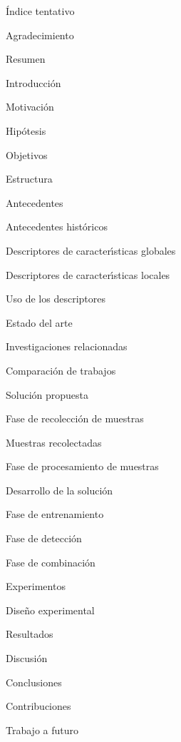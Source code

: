 \documentclass{article}
\def\autor{José Angel Ramírez Cantú}
\def\asesora{Dra.\ Satu Elisa Schaeffer}
\begin{document}
{\huge \'{I}ndice tentativo}

{\large Agradecimiento }

{\large Resumen}

\vspace*{2mm}

{\Large Introducci\'{o}n}

{\large Motivaci\'{o}n}

{\large Hip\'{o}tesis}

{\large Objetivos}

{\large Estructura}

\medskip

{\Large Antecedentes}

{\large Antecedentes hist\'{o}ricos}

{\large Descriptores de caracter\'{\i}sticas globales}

{\large Descriptores de caracter\'{\i}sticas locales}

{\large Uso de los descriptores}

\medskip

{\Large Estado del arte}

{\large Investigaciones relacionadas}

{\large Comparaci\'{o}n de trabajos}

\medskip

{\Large Soluci\'{o}n propuesta}

{\large Fase de recolecci\'{o}n de muestras}

{\large Muestras recolectadas}

{\large Fase de procesamiento de muestras}

\medskip

{\Large Desarrollo de la soluci\'{o}n}

{\large Fase de entrenamiento}

{\large Fase de detecci\'{o}n}

{\large Fase de combinaci\'{o}n}

\medskip

{\Large Experimentos}

{\large Dise\~{n}o experimental}

{\large Resultados}

{\large Discusi\'{o}n}

\medskip

{\Large Conclusiones}

{\large Contribuciones}

{\large Trabajo a futuro}


\end{document}
